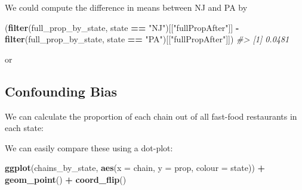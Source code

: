 \documentclass[]{book}
\newenvironment{Shaded}{\begin{snugshade}}{\end{snugshade}}
\newcommand{\KeywordTok}[1]{\textcolor[rgb]{0.13,0.29,0.53}{\textbf{#1}}}
\newcommand{\DataTypeTok}[1]{\textcolor[rgb]{0.13,0.29,0.53}{#1}}
\newcommand{\StringTok}[1]{\textcolor[rgb]{0.31,0.60,0.02}{#1}}
\newcommand{\CommentTok}[1]{\textcolor[rgb]{0.56,0.35,0.01}{\textit{#1}}}
\newcommand{\OperatorTok}[1]{\textcolor[rgb]{0.81,0.36,0.00}{\textbf{#1}}}
\newcommand{\NormalTok}[1]{#1}
\theoremstyle{definition}
\theoremstyle{definition}
\theoremstyle{definition}
\theoremstyle{remark}
\begin{document}
We could compute the difference in means between NJ and PA by

\begin{Shaded}
\begin{Highlighting}[]
\NormalTok{(}\KeywordTok{filter}\NormalTok{(full_prop_by_state, state }\OperatorTok{==}\StringTok{ "NJ"}\NormalTok{)[[}\StringTok{"fullPropAfter"}\NormalTok{]] }\OperatorTok{-}
\StringTok{  }\KeywordTok{filter}\NormalTok{(full_prop_by_state, state }\OperatorTok{==}\StringTok{ "PA"}\NormalTok{)[[}\StringTok{"fullPropAfter"}\NormalTok{]])}
\CommentTok{#> [1] 0.0481}
\end{Highlighting}
\end{Shaded}

or

\begin{Shaded}
\end{Shaded}

\subsection{Confounding Bias}\label{confounding-bias}

We can calculate the proportion of each chain out of all fast-food
restaurants in each state:

\begin{Shaded}
\end{Shaded}

We can easily compare these using a dot-plot:

\begin{Shaded}
\begin{Highlighting}[]
\KeywordTok{ggplot}\NormalTok{(chains_by_state, }\KeywordTok{aes}\NormalTok{(}\DataTypeTok{x =}\NormalTok{ chain, }\DataTypeTok{y =}\NormalTok{ prop, }\DataTypeTok{colour =}\NormalTok{ state)) }\OperatorTok{+}
\StringTok{  }\KeywordTok{geom_point}\NormalTok{() }\OperatorTok{+}
\StringTok{  }\KeywordTok{coord_flip}\NormalTok{()}
\end{Highlighting}
\end{Shaded}
\end{document}
